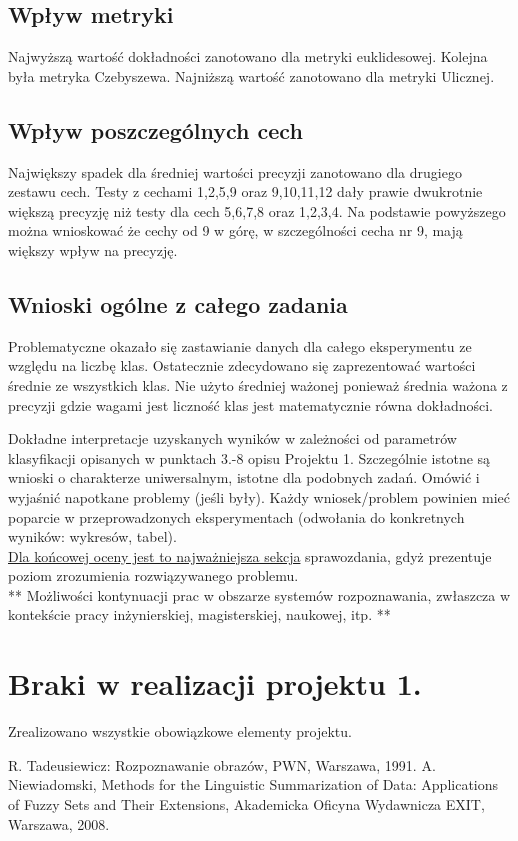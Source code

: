 \documentclass{classrep}
\begin{document}
\subsection{Wpływ metryki}
Najwyższą wartość dokładności zanotowano dla metryki euklidesowej. Kolejna była metryka Czebyszewa. Najniższą wartość zanotowano dla metryki Ulicznej.


\subsection{Wpływ poszczególnych cech}
Największy spadek dla średniej wartości precyzji zanotowano dla drugiego zestawu cech. Testy z cechami 1,2,5,9 oraz 9,10,11,12 dały prawie dwukrotnie większą precyzję niż testy dla cech 5,6,7,8 oraz 1,2,3,4. Na podstawie powyższego można wnioskować że cechy od 9 w górę, w szczególności cecha nr 9, mają większy wpływ na precyzję.

\subsection{Wnioski ogólne z całego zadania}
Problematyczne okazało się zastawianie danych dla całego eksperymentu ze względu na liczbę klas. Ostatecznie zdecydowano się zaprezentować wartości średnie ze wszystkich klas. Nie użyto średniej ważonej ponieważ średnia ważona z precyzji gdzie wagami jest liczność klas jest matematycznie równa dokładności.
\newline



Dokładne interpretacje uzyskanych wyników w zależności od parametrów klasyfikacji
opisanych w punktach 3.-8 opisu Projektu 1. 
Szczególnie istotne są wnioski o charakterze uniwersalnym, istotne dla podobnych zadań. 
Omówić i wyjaśnić napotkane problemy (jeśli były). Każdy wniosek/problem powinien mieć poparcie
w przeprowadzonych eksperymentach (odwołania do konkretnych wyników: wykresów,
tabel). \\
\underline{Dla końcowej oceny jest to najważniejsza sekcja} sprawozdania, gdyż prezentuje poziom
zrozumienia rozwiązywanego problemu.\\

** Możliwości kontynuacji prac w obszarze systemów rozpoznawania, zwłaszcza w kontekście pracy inżynierskiej,
magisterskiej, naukowej, itp. **\\



\section{Braki w realizacji projektu 1.}
Zrealizowano wszystkie obowiązkowe elementy projektu.


\begin{thebibliography}{0}
 R. Tadeusiewicz: Rozpoznawanie obrazów, PWN, Warszawa, 1991.  
 A. Niewiadomski, Methods for the Linguistic Summarization of Data: Applications of Fuzzy Sets and Their Extensions, Akademicka Oficyna Wydawnicza EXIT, Warszawa, 2008.
\end{thebibliography}
\end{document}
